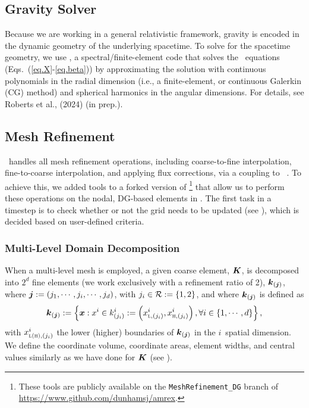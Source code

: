 \subsection{Gravity Solver}

Because we are working in a general relativistic framework, gravity is encoded
in the dynamic geometry of the underlying spacetime.
To solve for the spacetime geometry, we use \poseidon,
a spectral/finite-element code that solves the \xcfc\ equations
(Eqs.~(\ref{eq.X}-\ref{eq.beta}))
by approximating the solution with continuous polynomials
in the radial dimension
(i.e., a finite-element, or continuous Galerkin (CG) method)
and spherical harmonics in the angular dimensions.
For details, see Roberts et al., (2024) (in prep.).

\subsection{Mesh Refinement}
\label{ss.mr}

\thornado\ handles all mesh refinement operations,
including coarse-to-fine interpolation, fine-to-coarse interpolation,
and applying flux corrections,
via a coupling to \amrex\ \citep{zab2019}.
To achieve this, we added tools to a forked version of \amrex%
\footnote{These tools are publicly available on the
\texttt{MeshRefinement\_DG} branch of
\url{https://www.github.com/dunhamsj/amrex}.}
that allow us to perform these operations on the nodal, DG-based elements in
\thornado.
The first task in a timestep is to check whether or not the grid needs to
be updated (see ), which is decided based on user-defined
criteria.

\subsubsection{Multi-Level Domain Decomposition}

When a multi-level mesh is employed, a given coarse element, $\boldsymbol{K}$,
is decomposed into $2^{d}$ fine elements
(we work exclusively with a refinement ratio of 2),
$\boldsymbol{k}_{\left(\boldsymbol{j}\right)}$,
where $\boldsymbol{j}:=\left(j_{1},\cdots,j_{i},\cdots,j_{d}\right)$,
with $j_{i}\in\mathcal{R}:=\left\{1,2\right\}$,
and where $\boldsymbol{k}_{\left(\boldsymbol{j}\right)}$ is defined as
\begin{equation}
  \boldsymbol{k}_{\left(\boldsymbol{j}\right)}
  :=\left\{\boldsymbol{x}:x^{i}\in k^{i}_{\left(j_{i}\right)}
  :=\left(x^{i}_{\textsc{l},\left(j_{i}\right)},
          x^{i}_{\textsc{h},\left(j_{i}\right)}\right),
          \forall i\in\left\{1,\cdots,d\right\}\right\},
\end{equation}
with $x^{i}_{\textsc{l(h)},\left(j_{i}\right)}$ the lower (higher) boundaries
of $\boldsymbol{k}_{\left(\boldsymbol{j}\right)}$ in the $i$\myth\ spatial dimension.
We define the coordinate volume, coordinate areas, element widths, and
central values similarly as we have done for $\boldsymbol{K}$ (see ).

